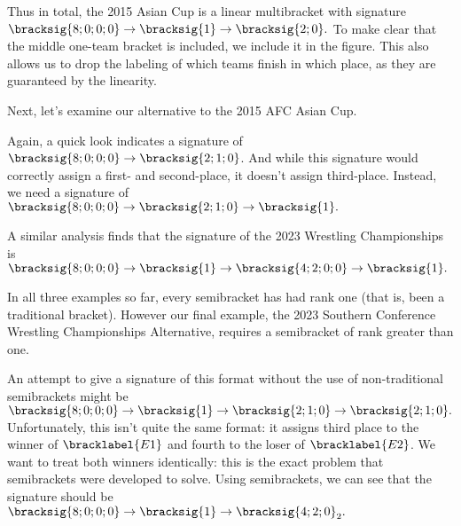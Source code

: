 {    Thus in total, the 2015 Asian Cup is a linear multibracket with signature $\bracksig{8;0;0;0} \to \bracksig{1} \to \bracksig{2;0}.$ To make clear that the middle one-team bracket is included, we include it in the figure. This also allows us to drop the labeling of which teams finish in which place, as they are guaranteed by the linearity.


    Next, let's examine our alternative to the 2015 AFC Asian Cup.


    Again, a quick look indicates a signature of $\bracksig{8;0;0;0} \to \bracksig{2;1;0}$. And while this signature would correctly assign a first- and second-place, it doesn't assign third-place. Instead, we need a signature of $\bracksig{8;0;0;0} \to \bracksig{2;1;0} \to \bracksig{1}.$


    A similar analysis finds that the signature of the 2023 Wrestling Championships is $\bracksig{8;0;0;0} \to \bracksig{1} \to \bracksig{4;2;0;0} \to \bracksig{1}.$


    In all three examples so far, every semibracket has had rank one (that is, been a traditional bracket). However our final example, the 2023 Southern Conference Wrestling Championships Alternative, requires a semibracket of rank greater than one.


    An attempt to give a signature of this format without the use of non-traditional semibrackets might be $\bracksig{8;0;0;0} \to \bracksig{1} \to \bracksig{2;1;0} \to \bracksig{2;1;0}.$ Unfortunately, this isn't quite the same format: it assigns third place to the winner of $\bracklabel{E1}$ and fourth to the loser of $\bracklabel{E2}$. We want to treat both winners identically: this is the exact problem that semibrackets were developed to solve. Using semibrackets, we can see that the signature should be $\bracksig{8;0;0;0} \to \bracksig{1} \to \bracksig{4;2;0}_2.$


}
